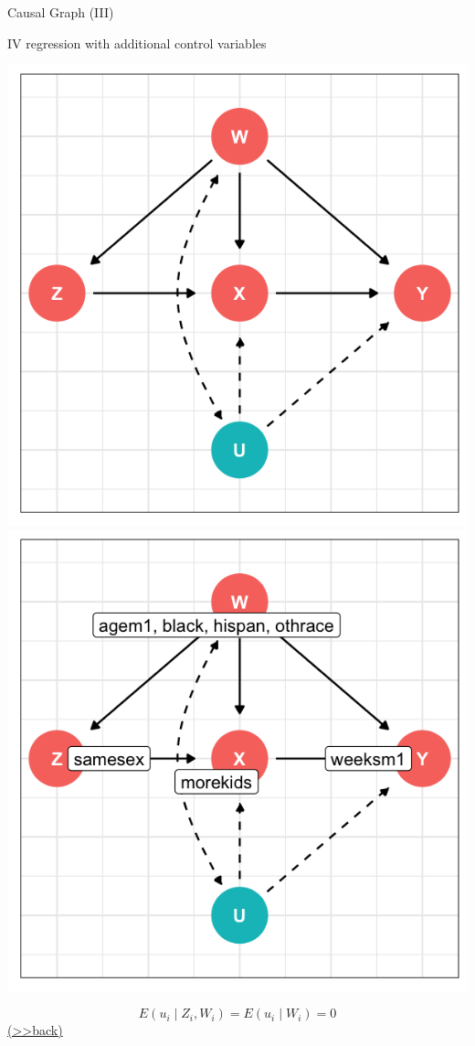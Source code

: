 \documentclass[
  10pt,
  ignorenonframetext,
]{beamer}
\begin{document}
\begin{frame}{Causal Graph (III)}
\protect\hypertarget{IVCCG}{}
\begin{block}{IV regression with additional control variables}
\protect\hypertarget{iv-regression-with-additional-control-variables-1}{}
\begin{center}\includegraphics[width=0.48\linewidth,height=0.58\textheight]{pictures/IVCsetting1} \includegraphics[width=0.48\linewidth,height=0.58\textheight]{pictures/IVCsetting2} \end{center}

\[
E(u_i \mid Z_i, W_i) = E(u_i \mid W_i) = 0
\]
\footnotesize\protect\hyperlink{IVCQ}{(\textgreater\textgreater back)}
\normalsize
\end{block}
\end{frame}
\end{document}
